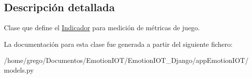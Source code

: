 \subsection{Descripción detallada}
Clase que define el \hyperlink{classappEmotionIOT_1_1models_1_1Indicador}{Indicador} para medición de métricas de juego. 

La documentación para esta clase fue generada a partir del siguiente fichero\+:\begin{DoxyCompactItemize}
\item 
/home/grego/\+Documentos/\+Emotion\+I\+O\+T/\+Emotion\+I\+O\+T\+\_\+\+Django/app\+Emotion\+I\+O\+T/models.\+py\end{DoxyCompactItemize}
